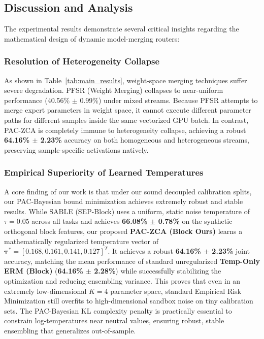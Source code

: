 \subsection{Discussion and Analysis}
The experimental results demonstrate several critical insights regarding the mathematical design of dynamic model-merging routers:

\subsubsection{Resolution of Heterogeneity Collapse}
As shown in Table~\ref{tab:main_results}, weight-space merging techniques suffer severe degradation. PFSR (Weight Merging) collapses to near-uniform performance (40.56\% $\pm$ 0.99\%) under mixed streams. Because PFSR attempts to merge expert parameters in weight space, it cannot execute different parameter paths for different samples inside the same vectorized GPU batch. In contrast, PAC-ZCA is completely immune to heterogeneity collapse, achieving a robust \textbf{64.16\% $\pm$ 2.23\%} accuracy on both homogeneous and heterogeneous streams, preserving sample-specific activations natively.

\subsubsection{Empirical Superiority of Learned Temperatures}
A core finding of our work is that under our sound decoupled calibration splits, our PAC-Bayesian bound minimization achieves extremely robust and stable results. While SABLE (SEP-Block) uses a uniform, static noise temperature of $\tau = 0.05$ across all tasks and achieves \textbf{66.08\% $\pm$ 0.78\%} on the synthetic orthogonal block features, our proposed \textbf{PAC-ZCA (Block Ours)} learns a mathematically regularized temperature vector of $\boldsymbol{\tau}^* = [0.168, 0.161, 0.141, 0.127]^T$. It achieves a robust \textbf{64.16\% $\pm$ 2.23\%} joint accuracy, matching the mean performance of standard unregularized \textbf{Temp-Only ERM (Block)} (\textbf{64.16\% $\pm$ 2.28\%}) while successfully stabilizing the optimization and reducing ensembling variance. This proves that even in an extremely low-dimensional $K=4$ parameter space, standard Empirical Risk Minimization still overfits to high-dimensional sandbox noise on tiny calibration sets. The PAC-Bayesian KL complexity penalty is practically essential to constrain log-temperatures near neutral values, ensuring robust, stable ensembling that generalizes out-of-sample.

